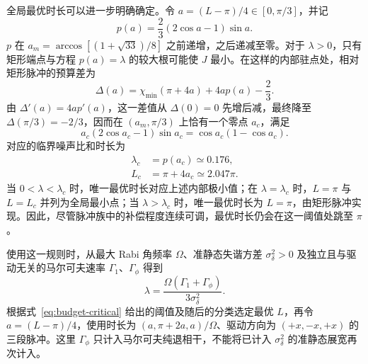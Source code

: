 \documentclass[12pt]{iopjournal}
\theoremstyle{definition}
\begin{document}
全局最优时长可以进一步明确确定。令 $a=(L-\pi)/4\in[0,\pi/3]$，并记
\begin{equation}
 p(a)=\frac23(2\cos a-1)\sin a.
 \label{eq:budget-slope}
\end{equation}
$p$ 在 $a_m=\arccos[(1+\sqrt{33})/8]$ 之前递增，之后递减至零。对于 $\lambda>0$，只有矩形端点与方程 $p(a)=\lambda$ 的较大根可能使 $J$ 最小。在这样的内部驻点处，相对矩形脉冲的预算差为
\begin{equation*}
 \Delta(a)=\chi_{\min}(\pi+4a)+4a p(a)-\frac23.
\end{equation*}
由 $\Delta'(a)=4a p'(a)$，这一差值从 $\Delta(0)=0$ 先增后减，最终降至 $\Delta(\pi/3)=-2/3$，因而在 $(a_m,\pi/3)$ 上恰有一个零点 $a_c$，满足
\begin{equation}
 a_c(2\cos a_c-1)\sin a_c=\cos a_c(1-\cos a_c).
 \label{eq:budget-transition}
\end{equation}
对应的临界噪声比和时长为
\begin{equation}
 \begin{aligned}
 \lambda_c&=p(a_c)\simeq0.176,\\
 L_c&=\pi+4a_c\simeq2.047\pi.
 \end{aligned}
 \label{eq:budget-critical}
\end{equation}
当 $0<\lambda<\lambda_c$ 时，唯一最优时长对应上述内部极小值；在 $\lambda=\lambda_c$ 时，$L=\pi$ 与 $L=L_c$ 并列为全局最小点；当 $\lambda>\lambda_c$ 时，唯一最优时长为 $L=\pi$，由矩形脉冲实现。因此，尽管脉冲族中的补偿程度连续可调，最优时长仍会在这一阈值处跳至 $\pi$。

使用这一规则时，从最大 Rabi 角频率 $\Omega$、准静态失谐方差 $\sigma_\delta^2>0$ 及独立且与驱动无关的马尔可夫速率 $\Gamma_1$、$\Gamma_\phi$ 得到
\begin{equation*}
 \lambda=\frac{\Omega(\Gamma_1+\Gamma_\phi)}{3\sigma_\delta^2}.
\end{equation*}
根据式~\eqref{eq:budget-critical} 给出的阈值及随后的分类选定最优 $L$，再令 $a=(L-\pi)/4$，使用时长为 $(a,\pi+2a,a)/\Omega$、驱动方向为 $(+x,-x,+x)$ 的三段脉冲。这里 $\Gamma_\phi$ 只计入马尔可夫纯退相干，不能将已计入 $\sigma_\delta^2$ 的准静态展宽再次计入。
\end{document}
